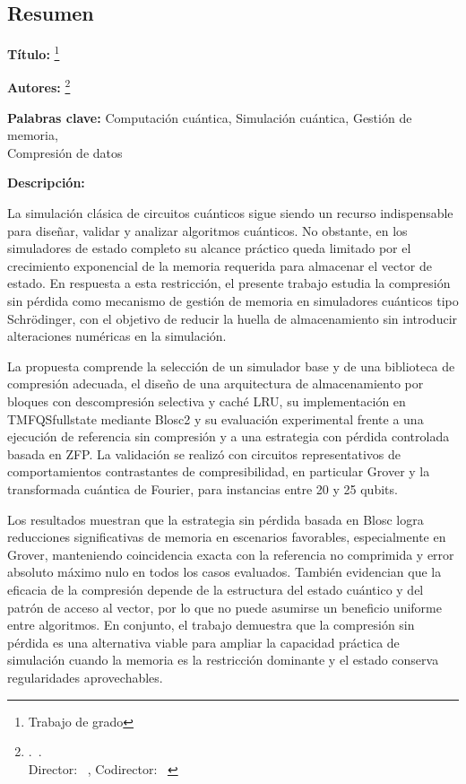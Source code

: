 \begin{singlespace}
\section*{Resumen}

\textbf{Título:} \tit\footnote{Trabajo de grado}

\textbf{Autores:} \nam\footnote{\fac.\ \esc.\\ Director: \tdir\ \dir, Codirector: \tcdir\ \cdir }

\textbf{Palabras clave:} { Computación cuántica, Simulación cuántica, Gestión de memoria,\\ Compresión de datos }

\textbf{Descripción:}

La simulación clásica de circuitos cuánticos sigue siendo un recurso indispensable para diseñar, validar y analizar algoritmos cuánticos. No obstante, en los simuladores de estado completo su alcance práctico queda limitado por el crecimiento exponencial de la memoria requerida para almacenar el vector de estado. En respuesta a esta restricción, el presente trabajo estudia la compresión sin pérdida como mecanismo de gestión de memoria en simuladores cuánticos tipo Schr\"odinger, con el objetivo de reducir la huella de almacenamiento sin introducir alteraciones numéricas en la simulación.

La propuesta comprende la selección de un simulador base y de una biblioteca de compresión adecuada, el diseño de una arquitectura de almacenamiento por bloques con descompresión selectiva y caché LRU, su implementación en TMFQSfullstate mediante Blosc2 y su evaluación experimental frente a una ejecución de referencia sin compresión y a una estrategia con pérdida controlada basada en ZFP. La validación se realizó con circuitos representativos de comportamientos contrastantes de compresibilidad, en particular Grover y la transformada cuántica de Fourier, para instancias entre 20 y 25 qubits.

Los resultados muestran que la estrategia sin pérdida basada en Blosc logra reducciones significativas de memoria en escenarios favorables, especialmente en Grover, manteniendo coincidencia exacta con la referencia no comprimida y error absoluto máximo nulo en todos los casos evaluados. También evidencian que la eficacia de la compresión depende de la estructura del estado cuántico y del patrón de acceso al vector, por lo que no puede asumirse un beneficio uniforme entre algoritmos. En conjunto, el trabajo demuestra que la compresión sin pérdida es una alternativa viable para ampliar la capacidad práctica de simulación cuando la memoria es la restricción dominante y el estado conserva regularidades aprovechables.
\end{singlespace}

